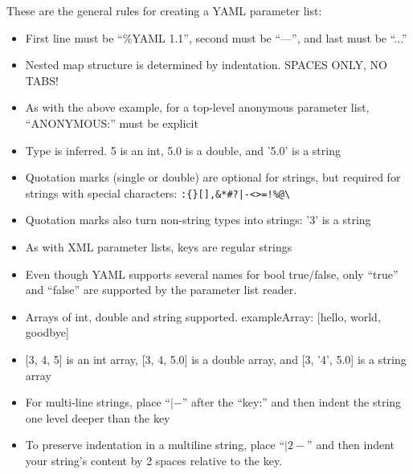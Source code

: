 These are the general rules for creating a YAML parameter list:
\begin{itemize}
\item First line must be ``\%YAML 1.1'', second must be ``---'', and last must be ``...''
\item Nested map structure is determined by indentation. SPACES ONLY, NO TABS!
\item As with the above example, for a top-level anonymous parameter list, ``ANONYMOUS:'' must be explicit
\item Type is inferred. 5 is an int, 5.0 is a double, and '5.0' is a string
\item Quotation marks (single or double) are optional for strings, but required for strings with special characters: \verb.:{}[],&*#?|-<>=!%@\.
\item Quotation marks also turn non-string types into strings: '3' is a string
\item As with XML parameter lists, keys are regular strings
\item Even though YAML supports several names for bool true/false, only ``true'' and ``false'' are supported by the parameter list reader.
\item Arrays of int, double and string supported. exampleArray: {[}hello, world, goodbye{]}
\item {[}3, 4, 5{]} is an int array, {[}3, 4, 5.0{]} is a double array, and {[}3, '4', 5.0{]} is a string array
\item For multi-line strings, place ``$|-$'' after the ``key:'' and then indent the string one level deeper than the key
\item To preserve indentation in a multiline string, place ``$|2-$'' and then indent your string's content by 2 spaces relative to the key.
\end{itemize}
